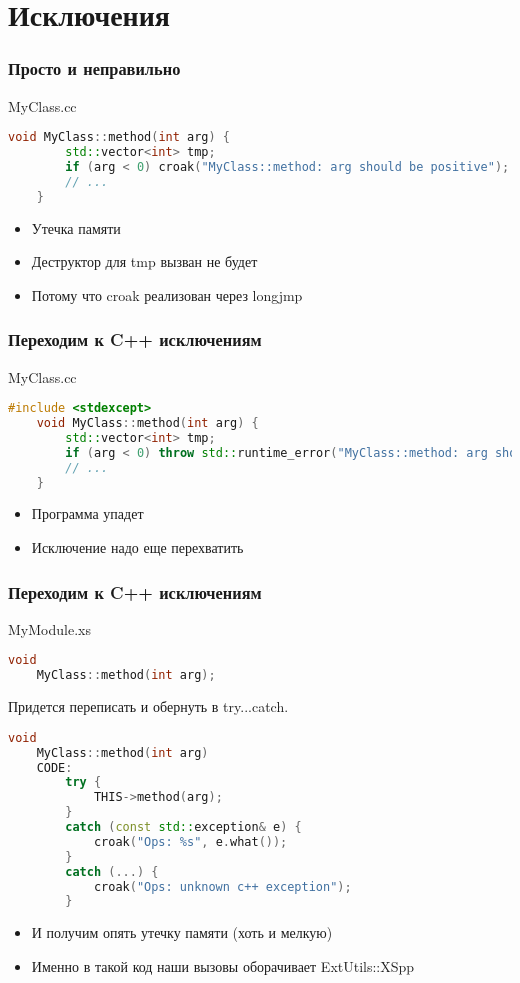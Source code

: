 \documentclass[utf8x]{beamer}
\begin{document}
\section{Исключения}

\begin{frame}[fragile]
    \frametitle{Просто и неправильно}
    MyClass.cc
    \begin{lstlisting}[language=C++,style=PerlXS]
    void MyClass::method(int arg) {
        std::vector<int> tmp;
        if (arg < 0) croak("MyClass::method: arg should be positive");
        // ...
    }
    \end{lstlisting}
    \begin{itemize}
        \item \alert{Утечка} памяти
        \item Деструктор для tmp вызван не будет
        \item Потому что croak реализован через longjmp
    \end{itemize}
\end{frame}

\begin{frame}[fragile]
    \frametitle{Переходим к C++ исключениям}
    MyClass.cc
    \begin{lstlisting}[language=C++,style=PerlXS]
    #include <stdexcept>
    void MyClass::method(int arg) {
        std::vector<int> tmp;
        if (arg < 0) throw std::runtime_error("MyClass::method: arg should be positive");
        // ...
    }
    \end{lstlisting}
    \begin{itemize}
        \item Программа упадет
        \item Исключение надо еще перехватить
    \end{itemize}
\end{frame}

\begin{frame}[fragile]
    \frametitle{Переходим к C++ исключениям}
    MyModule.xs
    \begin{lstlisting}[language=C++,style=PerlXS]
    void
    MyClass::method(int arg);
    \end{lstlisting}
    Придется переписать и обернуть в try...catch.
    \begin{lstlisting}[language=C++,style=PerlXS]
    void
    MyClass::method(int arg)
    CODE:
        try {
            THIS->method(arg);
        }
        catch (const std::exception& e) {
            croak("Ops: %s", e.what());
        }
        catch (...) {
            croak("Ops: unknown c++ exception");
        }
    \end{lstlisting}
    \begin{itemize}
        \item<2-| alert@2> И получим опять утечку памяти (хоть и мелкую)
        \item<3-> Именно в такой код наши вызовы оборачивает ExtUtils::XSpp
    \end{itemize}
\end{frame}
\end{document}
